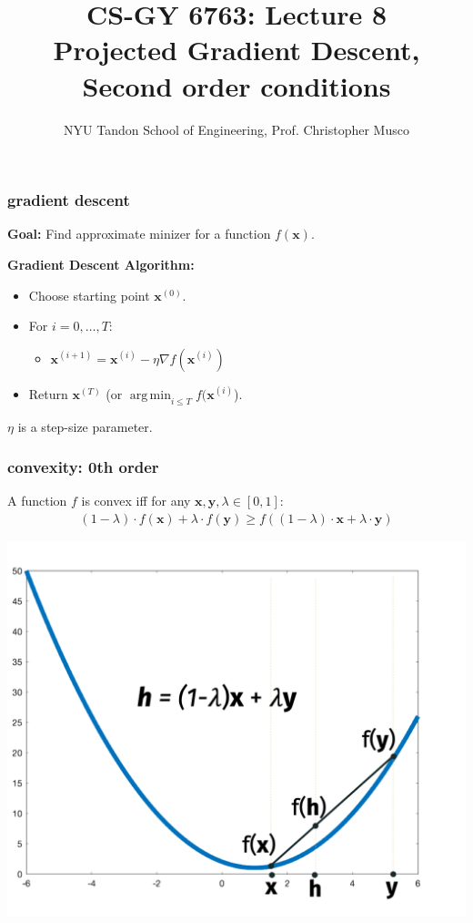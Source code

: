 \documentclass[compress]{beamer}
\title{CS-GY 6763: Lecture 8 \\ Projected Gradient Descent, Second order conditions}
\author{NYU Tandon School of Engineering, Prof. Christopher Musco}
\date{}
\newcommand{\bv}[1]{\mathbf{#1}}
\DeclareMathOperator*{\argmin}{arg\,min}
\begin{document}
\begin{frame}
	\titlepage 
\end{frame}


\begin{frame}
	\frametitle{gradient descent}
	\textbf{Goal:} Find approximate minizer for a function $f(\bv{x})$. 

	\textbf{Gradient Descent Algorithm:}
	\begin{itemize}
		\item Choose starting point $\bv{x}^{(0)}$.
		\item For $i = 0,\ldots, T$:
		\begin{itemize}
			\item $\bv{x}^{(i+1)} = \bv{x}^{(i)} - \eta \nabla f(\bv{x}^{(i)})$
		\end{itemize}
		\item Return $\bv{x}^{(T)}$ (or $\argmin_{i\leq T} f(\bv{x}^{(i)}$).
	\end{itemize}
	
	$\eta$ is a step-size parameter.
\end{frame}

\begin{frame}[t]
	\frametitle{convexity: 0th order}
	\begin{definition}[Convex]
		A function $f$ is convex iff for any $\bv{x}, \bv{y},\lambda \in [0,1]$:
		\begin{align*}
		(1-\lambda)\cdot f(\bv{x}) + \lambda \cdot f(\bv{y}) \geq f\left((1-\lambda)\cdot\bv{x} + \lambda \cdot\bv{y}\right)
		\end{align*}
	\end{definition}
\vspace{-.5em}
\begin{center}
	\includegraphics[width=.6\textwidth]{convex1.png}
\end{center}
\end{frame}
\end{document}

